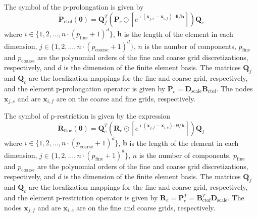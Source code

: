 \documentclass[review]{siamart190516}
\begin{document}
\begin{definition}\label{def:prolongation_symbol}
The symbol of the p-prolongation is given by
\begin{equation}
\tilde{\mathbf{P}}_{\text{ctof}} \left( \boldsymbol{\theta} \right) = \mathbf{Q}_f^T \left( \mathbf{P}_e \odot \left[ e^{\imath \left( \mathbf{x}_{j, c} - \mathbf{x}_{i, f} \right) \cdot \boldsymbol{\theta} / \mathbf{h}} \right] \right) \mathbf{Q}_c
\end{equation}
where $i \in \lbrace 1, 2, \dots, n \cdot \left( p_{\text{fine}} + 1 \right)^d \rbrace$, $\mathbf{h}$ is the length of the element in each dimension, $j \in \lbrace 1, 2, \dots, n \cdot \left( p_{\text{coarse}} + 1 \right)^d \rbrace$, $n$ is the number of components, $p_{\text{fine}}$ and $p_{\text{coarse}}$ are the polynomial orders of the fine and coarse grid discretizations, respectively, and $d$ is the dimension of the finite element basis.
The matrices $\mathbf{Q}_f$ and $\mathbf{Q}_c$ are the localization mappings for the fine and coarse grid, respectively, and the element p-prolongation operator is given by $\mathbf{P}_e = \mathbf{D}_{\text{scale}} \mathbf{B}_{\text{ctof}}$.
The nodes $\mathbf{x}_{j, c}$ and are $\mathbf{x}_{i, f}$ are on the coarse and fine grids, respectively.
\end{definition}

\begin{definition}\label{def:restriction_symbol}
The symbol of p-restriction is given by the expression
\begin{equation}
\tilde{\mathbf{R}}_{\text{ftoc}} \left( \boldsymbol{\theta} \right) = \mathbf{Q}_c^T \left( \mathbf{R}_e \odot \left[ e^{\imath \left( \mathbf{x}_{j, f} - \mathbf{x}_{i, c} \right) \cdot \boldsymbol{\theta} / \mathbf{h}} \right] \right) \mathbf{Q}_f
\end{equation}
where $i \in \lbrace 1, 2, \dots, n \cdot \left( p_{\text{coarse}} + 1 \right)^d \rbrace$, $\mathbf{h}$ is the length of the element in each dimension, $j \in \lbrace 1, 2, \dots, n \cdot \left( p_{\text{fine}} + 1 \right)^d \rbrace$, $n$ is the number of components, $p_{\text{fine}}$ and $p_{\text{coarse}}$ are the polynomial orders of the fine and coarse grid discretizations, respectively, and $d$ is the dimension of the finite element basis.
The matrices $\mathbf{Q}_f$ and $\mathbf{Q}_c$ are the localization mappings for the fine and coarse grid, respectively, and the element p-restriction operator is given by $\mathbf{R}_e = \mathbf{P}_e^T = \mathbf{B}_{\text{ctof}}^T \mathbf{D}_{\text{scale}}$.
The nodes $\mathbf{x}_{j, f}$ and are $\mathbf{x}_{i, c}$ are on the fine and coarse grids, respectively.
\end{definition}
\end{document}
